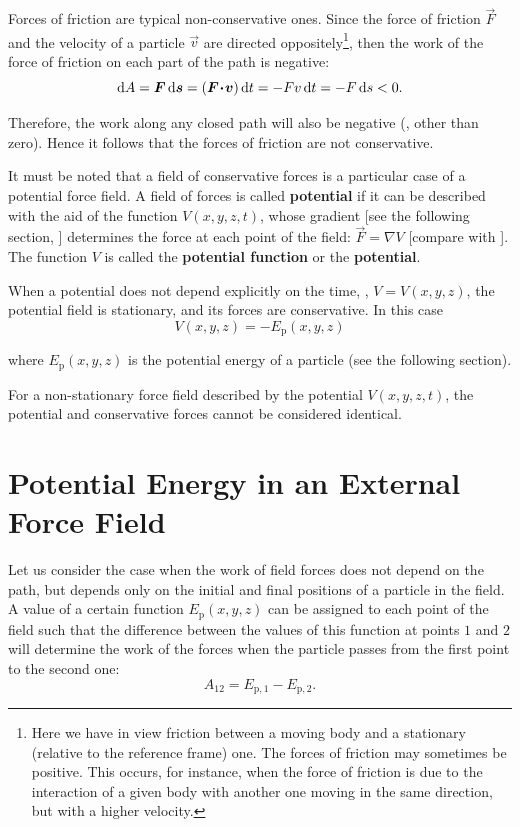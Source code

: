 Forces of friction are typical non-conservative ones. Since the force of friction $\vec{F}$ and the velocity of a particle $\vec{v}$ are directed oppositely\footnote{Here we have in view friction between a moving body and a stationary (relative to the reference frame) one. The forces of friction may sometimes be positive. This occurs, for instance, when the force of friction is due to the interaction of a given body with another one moving in the same direction, but with a higher velocity.}, then the work of the force of friction on each part of the path is negative:
\begin{equation*}
\mathrm{d} A = \boldsymbol{F}\,\mathrm{d}\boldsymbol{s} = (\boldsymbol{F\!\cdot\!v})\,\mathrm{d} t = -Fv\,\mathrm{d} t = -F\,\mathrm{d} s<0.
\end{equation*}

\noindent
Therefore, the work along any closed path will also be negative (\ie, other than zero). Hence it follows that the forces of friction are not conservative.

It must be noted that a field of conservative forces is a particular case of a potential force field. A field of forces is called \textbf{potential} if it can be described with the aid of the function $V(x,y,z,t)$, whose gradient [see the following section, ] determines the force at each point of the field: $\vec{F}=\nabla V$ [compare with ]. The function $V$ is called the \textbf{potential function} or the \textbf{potential}.

When a potential does not depend explicitly on the time, \ie, $V=V(x,y,z)$, the potential field is stationary, and its forces are conservative. In this case
\begin{equation*}
V(x,y,z) = -E_{\text{p}}(x,y,z)
\end{equation*}

\noindent
where $E_{\text{p}}(x,y,z)$ is the potential energy of a particle (see the following section).

For a non-stationary force field described by the potential $V(x,y,z,t)$, the potential and conservative forces cannot be considered identical.

\section{Potential Energy in an External Force Field}\label{sec:3_5}

Let us consider the case when the work of field forces does not depend on the path, but depends only on the initial and final positions of a particle in the field. A value of a certain function $E_{\text{p}}(x,y,z)$ can be assigned to each point of the field such that the difference between the values of this function at points $1$ and $2$ will determine the work of the forces when the particle passes from the first point to the second one:
\begin{equation}\label{eq:3_26}
A_{12} = E_{\text{p},1} - E_{\text{p},2}.
\end{equation}

